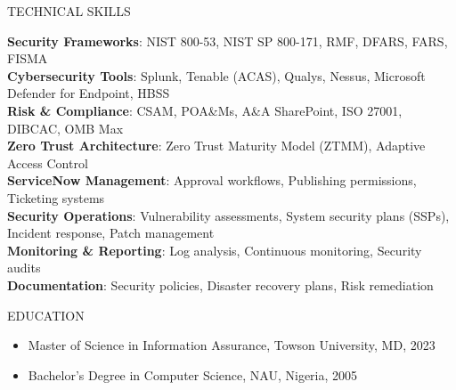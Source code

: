 \documentclass{resume} %
\begin{document}
\begin{rSection}{TECHNICAL SKILLS}
    \begin{flushleft}
                    \textbf{Security Frameworks}: NIST 800{-}53, NIST SP 800{-}171, RMF, DFARS, FARS, FISMA \\
                    \textbf{Cybersecurity Tools}: Splunk, Tenable (ACAS), Qualys, Nessus, Microsoft Defender for Endpoint, HBSS \\
                    \textbf{Risk \& Compliance}: CSAM, POA\&Ms, A\&A SharePoint, ISO 27001, DIBCAC, OMB Max \\
                    \textbf{Zero Trust Architecture}: Zero Trust Maturity Model (ZTMM), Adaptive Access Control \\
                    \textbf{ServiceNow Management}: Approval workflows, Publishing permissions, Ticketing systems \\
                    \textbf{Security Operations}: Vulnerability assessments, System security plans (SSPs), Incident response, Patch management \\
                    \textbf{Monitoring \& Reporting}: Log analysis, Continuous monitoring, Security audits \\
                    \textbf{Documentation}: Security policies, Disaster recovery plans, Risk remediation \\
            \end{flushleft}
\end{rSection}

\begin{rSection}{EDUCATION}
    \begin{flushleft}
    \begin{itemize}
                    \item Master of Science in Information Assurance, Towson University, MD, 2023 \\
                    \item Bachelor's Degree in Computer Science, NAU, Nigeria, 2005 \\
            \end{itemize}
    \end{flushleft}
\end{rSection}
\end{document}
